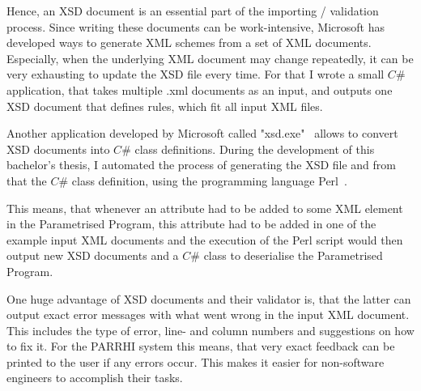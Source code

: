 Hence, an XSD document is an essential part of the importing / validation process. Since writing these documents can be work-intensive, Microsoft has developed ways to generate XML schemes from a set of XML documents. Especially, when the underlying XML document may change repeatedly, it can be very exhausting to update the XSD file every time. For that I wrote a small $C\#$ application, that takes multiple .xml documents as an input, and outputs one XSD document that defines rules, which fit all input XML files. 

Another application developed by Microsoft called "xsd.exe"~\cite{xsdExe} allows to convert XSD documents into $C\#$ class definitions. During the development of this bachelor's thesis, I automated the process of generating the XSD file and from that the $C\#$ class definition, using the programming language Perl~\cite{perl}.

This means, that whenever an attribute had to be added to some XML element in the Parametrised Program, this attribute had to be added in one of the example input XML documents and the execution of the Perl script would then output new XSD documents and a $C\#$ class to deserialise the Parametrised Program. 

One huge advantage of XSD documents and their validator is, that the latter can output exact error messages with what went wrong in the input XML document. This includes the type of error, line- and column numbers and suggestions on how to fix it. For the PARRHI system this means, that very exact feedback can be printed to the user if any errors occur. This makes it easier for non-software engineers to accomplish their tasks.




















